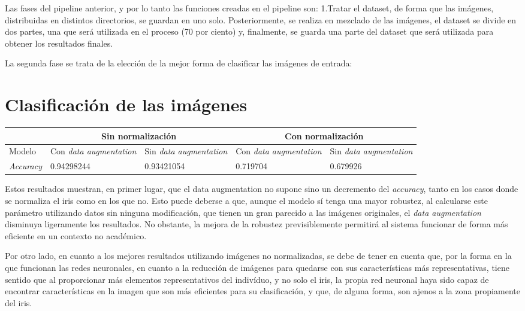 Las fases del pipeline anterior, y por lo tanto las funciones creadas en el pipeline son:
1.Tratar el dataset, de forma que las imágenes, distribuidas en distintos directorios, se guardan en uno solo. Posteriormente, se realiza en mezclado de las imágenes, el dataset se divide en dos partes, 
una que será utilizada en el proceso (70 por ciento) y, finalmente, se guarda una parte del dataset que será utilizada para obtener los resultados finales.

La segunda fase se trata de la elección de la mejor forma de clasificar las imágenes de entrada:

\section{Clasificación de las imágenes}

\begin{tabular}{ |p{3cm}||p{3cm}|p{3cm}|p{3cm}|p{3cm}|  }
    \hline
     & \multicolumn{2}{|c|}{Sin normalización} & \multicolumn{2}{|c|}{Con normalización} \\
    \hline
    Modelo& Con \textit{data augmentation} & Sin \textit{data augmentation} &Con \textit{data augmentation}&Sin \textit{data augmentation}\\
    \hline
    \textit{Accuracy} & 0.94298244   & 0.93421054    & 0.719704 &   0.679926\\
    \hline
   \end{tabular}


Estos resultados muestran, en primer lugar, que el data augmentation no supone sino un decremento del \textit{accuracy}, tanto en los casos donde se normaliza el iris
como en los que no. Esto puede deberse a que, aunque el modelo sí tenga una mayor robustez, al calcularse este parámetro utilizando datos sin ninguna modificación, que 
tienen un gran parecido a las imágenes originales, el \textit{data augmentation} disminuya ligeramente los resultados. No obstante, la mejora de la robustez previsiblemente
permitirá al sistema funcionar de forma más eficiente en un contexto no académico.

Por otro lado, en cuanto a los mejores resultados utilizando imágenes no normalizadas, se debe de tener en cuenta que, por la forma en la que funcionan las redes neuronales,
en cuanto a la reducción de imágenes para quedarse con sus características más representativas, tiene sentido que al proporcionar más elementos representativos del indivíduo,
y no solo el iris, la propia red neuronal haya sido capaz de encontrar características en la imagen que son más eficientes para su clasificación, y que, de alguna forma, son
ajenos a la zona propiamente del iris.


